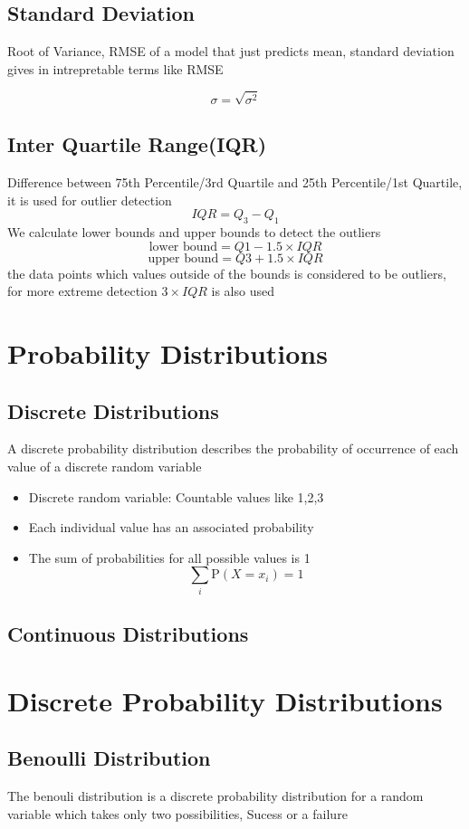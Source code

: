 \documentclass[12pt]{extarticle}
\begin{document}
\subsection{Standard Deviation}
Root of Variance, 
RMSE of a model that just predicts mean, 
standard deviation gives in intrepretable terms like RMSE

$$ \sigma = \sqrt{\sigma^2} $$
\subsection{Inter Quartile Range(IQR)}
Difference between 75th Percentile/3rd Quartile and 25th Percentile/1st Quartile, it is used for outlier detection 
$$IQR = Q_3 - Q_1$$ 
We calculate lower bounds and upper bounds to detect the outliers
$$ \text{lower bound}= Q1-1.5 \times IQR$$
$$ \text{upper bound}= Q3+1.5 \times IQR$$
the data points which values outside of the bounds is considered to be outliers, for more extreme detection \(3 \times IQR\) is also used

\section{Probability Distributions}

\subsection{Discrete Distributions}
A discrete probability distribution describes the probability of occurrence of each value of a discrete random variable
\begin{itemize}
    \item Discrete random variable: Countable values like 1,2,3
    \item Each individual value has an associated probability 
    \item The sum of probabilities for all possible values is 1
    $$ \sum_i \mathrm{P}(X=x_i)=1$$
\end{itemize}

\subsection{Continuous Distributions}

\section{Discrete Probability Distributions}
\subsection{Benoulli Distribution}
The benouli distribution is a discrete probability distribution for a random variable which takes only two possibilities, Sucess or a failure 
\end{document}
